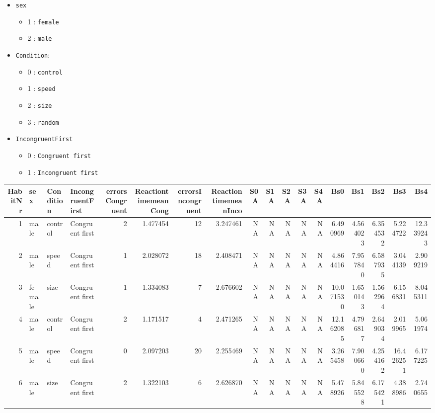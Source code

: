 \documentclass[
]{book}
\providecommand{\tightlist}{%
  \setlength{\itemsep}{0pt}\setlength{\parskip}{0pt}}
\begin{document}
\begin{itemize}
\tightlist
\item
  \texttt{sex}

  \begin{itemize}
  \tightlist
  \item
    1 : \texttt{female}
  \item
    2 : \texttt{male}
  \end{itemize}
\item
  \texttt{Condition}:

  \begin{itemize}
  \tightlist
  \item
    0 : \texttt{control}
  \item
    1 : \texttt{speed}
  \item
    2 : \texttt{size}
  \item
    3 : \texttt{random}
  \end{itemize}
\item
  \texttt{IncongruentFirst}

  \begin{itemize}
  \tightlist
  \item
    0 : \texttt{Congruent\ first}
  \item
    1 : \texttt{Incongruent\ first}
  \end{itemize}
\end{itemize}

\begin{tabular}{r|l|l|l|r|r|r|r|r|r|r|r|r|r|r|r|r|r}
\hline
HabitNr & sex & Condition & IncongruentFirst & errorsCongruent & ReactiontimemeanCong & errorsIncongruent & ReactiontimemeanInco & S0A & S1A & S2A & S3A & S4A & Bs0 & Bs1 & Bs2 & Bs3 & Bs4\\
\hline
1 & male & control & Congruent first & 2 & 1.477454 & 12 & 3.247461 & NA & NA & NA & NA & NA & 6.490969 & 4.564023 & 6.354532 & 5.224722 & 12.339243\\
\hline
2 & male & speed & Congruent first & 1 & 2.028072 & 18 & 2.408471 & NA & NA & NA & NA & NA & 4.864416 & 7.957840 & 6.587935 & 3.044139 & 2.909219\\
\hline
3 & female & size & Congruent first & 1 & 1.334083 & 7 & 2.676602 & NA & NA & NA & NA & NA & 10.071530 & 1.650143 & 1.562964 & 6.156831 & 8.045311\\
\hline
4 & male & control & Congruent first & 2 & 1.171517 & 4 & 2.471265 & NA & NA & NA & NA & NA & 12.162085 & 4.796817 & 2.649034 & 2.019965 & 5.061974\\
\hline
5 & male & speed & Congruent first & 0 & 2.097203 & 20 & 2.255469 & NA & NA & NA & NA & NA & 3.265458 & 7.900660 & 4.254162 & 16.426251 & 6.177225\\
\hline
6 & male & size & Congruent first & 2 & 1.322103 & 6 & 2.626870 & NA & NA & NA & NA & NA & 5.478926 & 5.845528 & 6.175421 & 4.388986 & 2.740655\\
\hline
\end{tabular}
\end{document}
